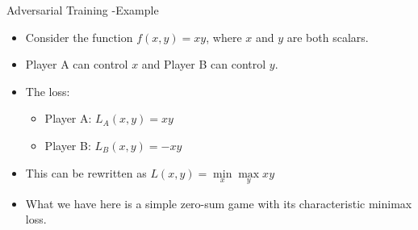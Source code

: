 

\begin{frame} {Adversarial Training -Example}
\begin{figure}
\centering
{}
\end{figure}
\begin{itemize}
\item Consider the function $f(x,y) = xy$, where $x$ and $y$ are both scalars.
\item Player A can control $x$ and Player B can control $y$.
    \item The loss:
    \begin{itemize}
\item Player A: $L_{A}(x,y) = xy$
    \item Player B: $L_{B}(x,y) = -xy$
    \end{itemize}
\item This can be rewritten as $L(x,y) = \min \limits_x \max \limits_y xy$
    \item What we have here is a simple zero-sum game with its characteristic minimax loss.
\end{itemize}
\end{frame}

